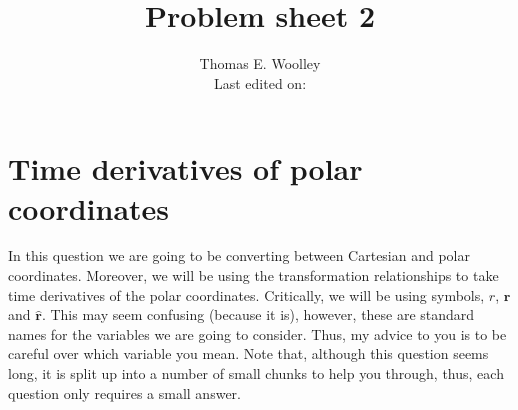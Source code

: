 \documentclass[]{article}
\begin{document}


\title{Problem sheet 2}
\author{Thomas E. Woolley\\Last edited on:}
\maketitle
\section{Time derivatives of polar coordinates}\label{Polar_derivatives}
In this question we are going to be converting between Cartesian and polar coordinates. Moreover, we will be using the transformation relationships to take time derivatives of the polar coordinates. Critically, we will be using symbols, $r$, $\bm{r}$ and $\hat{\bm{r}}$. This may seem confusing (because it is), however, these are standard names for the variables we are going to consider. Thus, my advice to you is to be careful over which variable you mean. Note that, although this question seems long, it is split up into a number of small chunks to help you through, thus, each question only requires a small answer.
\end{document}
